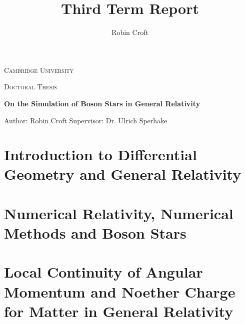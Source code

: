 \documentclass[11pt]{report}  %
\title{Third Term Report}
\author{Robin Croft}
\numberwithin{equation}{section}
\begin{document}
\begin{titlepage}
  \centering
  
  \centering
  {\scshape\LARGE Cambridge University \par}
  \vspace{1cm}
  {\scshape\Large Doctoral Thesis \par} 
    \vspace{2cm} 
    \hline
    \vspace{0.3cm}
  {\Large\itshape \par}
  {\huge\bfseries On the Simulation of Boson Stars in General Relativity\par} \vspace{0.3cm}
  \hline
  \vfill
   Author: Robin Croft
\vfill
  Supervisor: Dr. Ulrich Sperhake
  \vfill

    \begin{figure}[h!]
  \centering
\end{figure}


\end{titlepage}						%
\tableofcontents
\newpage
{}





\chapter{Introduction to Differential Geometry and General Relativity}












\chapter{Numerical Relativity, Numerical Methods and Boson Stars}



%









\chapter{Local Continuity of Angular Momentum and Noether Charge for
Matter in General Relativity}
\end{document}
